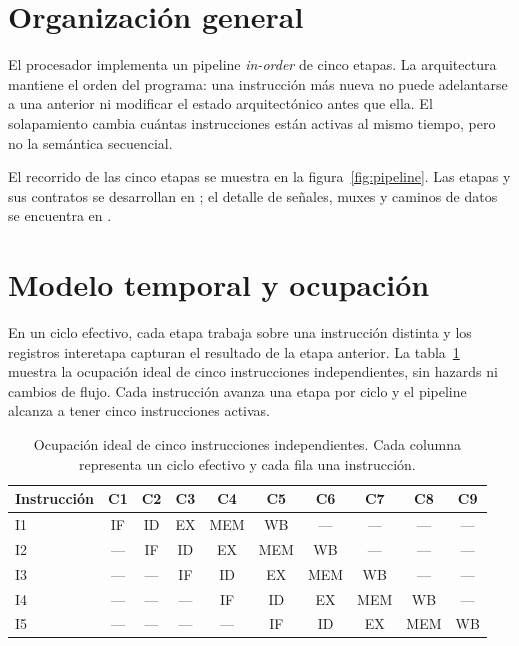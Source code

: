\section{Organización general}

El procesador implementa un pipeline \emph{in-order} de cinco etapas. La
arquitectura mantiene el orden del programa: una instrucción más nueva no puede
adelantarse a una anterior ni modificar el estado arquitectónico antes que
ella. El solapamiento cambia cuántas instrucciones están activas al mismo
tiempo, pero no la semántica secuencial.

El recorrido de las cinco etapas se muestra en la
figura~\ref{fig:pipeline}. Las etapas y sus contratos se desarrollan en
; el detalle de
señales, muxes y caminos de datos se encuentra en
.

\section{Modelo temporal y ocupación}

En un ciclo efectivo, cada etapa trabaja sobre una instrucción distinta y los
registros interetapa capturan el resultado de la etapa anterior. La
tabla~\ref{tab:ocupacion} muestra la ocupación ideal de cinco instrucciones
independientes, sin hazards ni cambios de flujo. Cada instrucción avanza una
etapa por ciclo y el pipeline alcanza a tener cinco instrucciones activas.

\begin{table}[H]
  \centering
  \small
  \setlength{\tabcolsep}{3pt}
  \begin{tabular}{l*{9}{c}}
    \toprule
    \textbf{Instrucción} & C1 & C2 & C3 & C4 & C5 & C6 & C7 & C8 & C9 \\
    \midrule
    I1 & IF & ID & EX & MEM & WB & --- & --- & --- & --- \\
    I2 & --- & IF & ID & EX & MEM & WB & --- & --- & --- \\
    I3 & --- & --- & IF & ID & EX & MEM & WB & --- & --- \\
    I4 & --- & --- & --- & IF & ID & EX & MEM & WB & --- \\
    I5 & --- & --- & --- & --- & IF & ID & EX & MEM & WB \\
    \bottomrule
  \end{tabular}
  \caption{Ocupación ideal de cinco instrucciones independientes. Cada columna
  representa un ciclo efectivo y cada fila una instrucción.}
  \label{tab:ocupacion}
\end{table}

